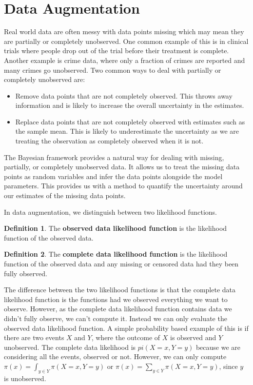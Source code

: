 \documentclass[
]{book}
\providecommand{\tightlist}{%
  \setlength{\itemsep}{0pt}\setlength{\parskip}{0pt}}
\theoremstyle{definition}
\newtheorem{definition}{Definition}[chapter]
\theoremstyle{definition}
\theoremstyle{definition}
\theoremstyle{definition}
\theoremstyle{remark}
\begin{document}
\hypertarget{data-augmentation}{%
\section{Data Augmentation}\label{data-augmentation}}

Real world data are often messy with data points missing which may mean they are partially or completely unobserved. One common example of this is in clinical trials where people drop out of the trial before their treatment is complete. Another example is crime data, where only a fraction of crimes are reported and many crimes go unobserved. Two common ways to deal with partially or completely unobserved are:

\begin{itemize}
\tightlist
\item
  Remove data points that are not completely observed. This throws away information and is likely to increase the overall uncertainty in the estimates.
\item
  Replace data points that are not completely observed with estimates such as the sample mean. This is likely to underestimate the uncertainty as we are treating the observation as completely observed when it is not.
\end{itemize}

The Bayesian framework provides a natural way for dealing with missing, partially, or completely unobserved data. It allows us to treat the missing data points as random variables and infer the data points alongside the model parameters. This provides us with a method to quantify the uncertainty around our estimates of the missing data points.

In data augmentation, we distinguish between two likelihood functions.

\begin{definition}
The \textbf{observed data likelihood function} is the likelihood function of the observed data.
\end{definition}

\begin{definition}
The \textbf{complete data likelihood function} is the likelihood function of the observed data and any missing or censored data had they been fully observed.
\end{definition}

The difference between the two likelihood functions is that the complete data likelihood function is the functions had we observed everything we want to observe. However, as the complete data likelihood function contains data we didn't fully observe, we can't compute it. Instead we can only evaluate the observed data likelihood function. A simple probability based example of this is if there are two events \(X\) and \(Y\), where the outcome of \(X\) is observed and \(Y\) unobserved. The complete data likelihood is \(pi(X = x, Y = y)\) because we are considering all the events, observed or not. However, we can only compute \(\pi(x) = \int_{y \in Y}\pi(X = x, Y = y)\) or \(\pi(x) = \sum_{y \in Y}\pi(X = x, Y = y)\), since \(y\) is unobserved.
\end{document}
